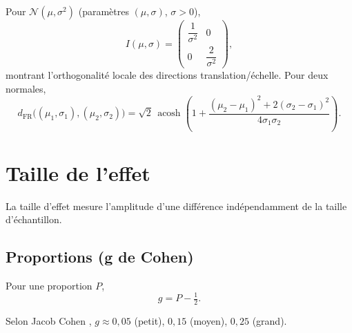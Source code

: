 Pour $\mathcal{N}(\mu,\sigma^{2})$ (paramètres $(\mu,\sigma)$, $\sigma>0$),
\begin{equation}
	I(\mu,\sigma)=\begin{pmatrix} \dfrac{1}{\sigma^{2}} & 0\\[4pt] 0 & \dfrac{2}{\sigma^{2}} \end{pmatrix},
\end{equation}
montrant l'orthogonalité locale des directions translation/échelle. Pour deux normales, \citep{nielsen2023simple}
\begin{equation}
	d_{\mathrm{FR}}\big((\mu_1,\sigma_1),(\mu_2,\sigma_2)\big)
	=\sqrt{2}\,\operatorname{acosh}\!\left(1+\frac{(\mu_2-\mu_1)^2+2(\sigma_2-\sigma_1)^2}{4\sigma_1\sigma_2}\right).
	\label{eq:fr_normal}
\end{equation}

\section{Taille de l'effet}
La taille d'effet mesure l'amplitude d'une différence indépendamment de la taille d'échantillon.

\subsection*{Proportions (g de Cohen)}
Pour une proportion $P$,
\begin{equation}
	g = P - \tfrac12.
\end{equation}

Selon Jacob Cohen \citep{cohen1992power}, $g\approx 0,05$ (petit), $0,15$ (moyen), $0,25$ (grand).
